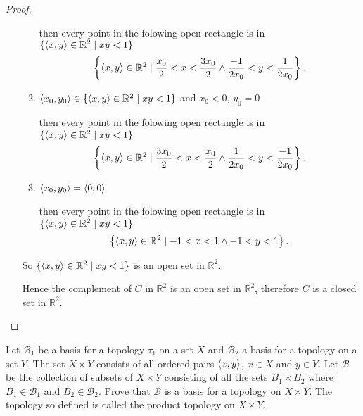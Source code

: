 \begin{proof}
\begin{enumerate}[label={(\roman*)}]
\begin{enumerate}[label={\textbf{Case \arabic*.}},itemindent=1cm]
			            then every point in the folowing open rectangle is in $\{ \left\langle{x, y}\right\rangle\in \mathbb{R}^{2} \mid xy < 1 \}$
			            \[
				            \left\{ \left\langle{x, y}\right\rangle\in \mathbb{R}^{2} \mid \frac{x_{0}}{2} < x < \frac{3x_{0}}{2} \wedge \frac{-1}{2x_{0}} < y < \frac{1}{2x_{0}} \right\}.
			            \]
			      \item $\left\langle{x_{0}, y_{0}}\right\rangle\in \{ \left\langle{x, y}\right\rangle\in \mathbb{R}^{2} \mid xy < 1 \}$ and $x_{0} < 0$, $y_{0} = 0$

			            then every point in the folowing open rectangle is in $\{ \left\langle{x, y}\right\rangle\in \mathbb{R}^{2} \mid xy < 1 \}$
			            \[
				            \left\{ \left\langle{x, y}\right\rangle\in \mathbb{R}^{2} \mid \frac{3x_{0}}{2} < x < \frac{x_{0}}{2} \wedge \frac{1}{2x_{0}} < y < \frac{-1}{2x_{0}}\right\}.
			            \]
			      \item $\left\langle{x_{0}, y_{0}}\right\rangle = \left\langle{0, 0}\right\rangle$

			            then every point in the folowing open rectangle is in $\{ \left\langle{x, y}\right\rangle\in \mathbb{R}^{2} \mid xy < 1 \}$
			            \[
				            \left\{ \left\langle{x, y}\right\rangle\in \mathbb{R}^{2} \mid -1 < x < 1 \wedge -1 < y < 1 \right\}.
			            \]
		      \end{enumerate}

		      So $\{ \left\langle{x, y}\right\rangle\in \mathbb{R}^{2} \mid xy < 1 \}$ is an open set in $\mathbb{R}^{2}$.

		      Hence the complement of $C$ in $\mathbb{R}^{2}$ is an open set in $\mathbb{R}^{2}$, therefore $C$ is a closed set in $\mathbb{R}^{2}$.
	\end{enumerate}
\end{proof}
\newpage

\begin{exercise}
	Let $\mathcal{B}_{1}$ be a basis for a topology $\tau_{1}$ on a set $X$ and $\mathcal{B}_{2}$  a basis for a topology on a set $Y$. The set $X\times Y$ consists of all ordered pairs $\left\langle{x, y}\right\rangle$, $x\in X$ and $y\in Y$. Let $\mathcal{B}$ be the collection of subsets of $X\times Y$ consisting of all the sets $B_{1}\times B_{2}$ where $B_{1}\in \mathcal{B}_{1}$ and $B_{2}\in \mathcal{B}_{2}$. Prove that $\mathcal{B}$ is a basis for a topology on $X\times Y$. The topology so defined is called the {\color{red}product topology} on $X\times Y$.
\end{exercise}

